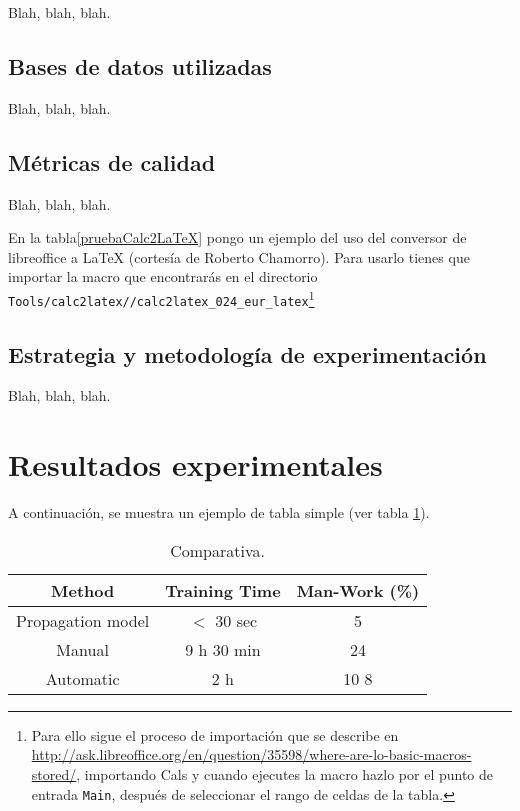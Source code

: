 Blah, blah, blah.


\subsection{Bases de datos utilizadas}
\label{sec:bases-de-datos-1}

Blah, blah, blah.


\subsection{Métricas de calidad}
\label{sec:metricas-de-calidad}

Blah, blah, blah.

En la tabla\ref{pruebaCalc2LaTeX} pongo un ejemplo del uso del conversor
de libreoffice a \LaTeX{} (cortesía de Roberto Chamorro). Para usarlo
tienes que importar la macro que encontrarás en el directorio
\texttt{Tools/calc2latex//calc2latex\_024\_eur\_latex}\footnote{Para
  ello sigue el proceso de importación que se describe en
  \url{http://ask.libreoffice.org/en/question/35598/where-are-lo-basic-macros-stored/},
  importando Cals
  y cuando ejecutes la macro hazlo por el punto de entrada
  \texttt{Main}, después de seleccionar el rango de celdas de la tabla.}




\subsection{Estrategia y metodología de experimentación}
\label{sec:estr-y-metod}

Blah, blah, blah.


\section{Resultados experimentales}
\label{sec:result-experim}

A continuación, se muestra un ejemplo de tabla simple (ver tabla \ref{table1}).

\begin{table}
  \renewcommand{\arraystretch}{1.3}
  \caption{Comparativa.}
  \label{table1}
  \begin{center}
    \begin{tabular}{|c|c|c|}
      \hline
      Method & Training Time & Man-Work (\%)\\
      \hline
      Propagation model & $<$ 30 sec & 5\\
      \hline
      Manual & 9 h 30 min & 24\\
      \hline
      Automatic & 2 h & 10 8\\
      \hline
    \end{tabular}
  \end{center}
\end{table}

